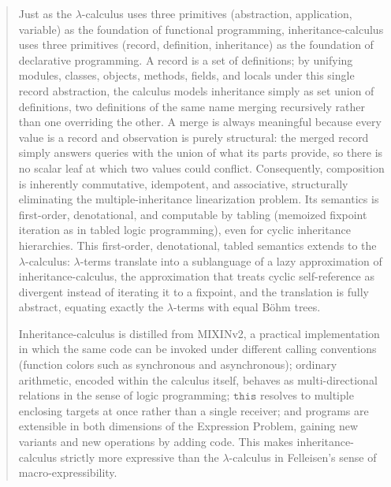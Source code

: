 \begin{abstract}
  Just as the $\lambda$-calculus uses three primitives (abstraction, application, variable) as the foundation of functional programming, inheritance-calculus uses three primitives (record, definition, inheritance) as the foundation of declarative programming. A record is a set of definitions; by unifying modules, classes, objects, methods, fields, and locals under this single record abstraction, the calculus models inheritance simply as set union of definitions, two definitions of the same name merging recursively rather than one overriding the other. A merge is always meaningful because every value is a record and observation is purely structural: the merged record simply answers queries with the union of what its parts provide, so there is no scalar leaf at which two values could conflict. Consequently, composition is inherently commutative, idempotent, and associative, structurally eliminating the multiple-inheritance linearization problem. Its semantics is first-order, denotational, and computable by tabling (memoized fixpoint iteration as in tabled logic programming), even for cyclic inheritance hierarchies. This first-order, denotational, tabled semantics extends to the $\lambda$-calculus: $\lambda$-terms translate into a sublanguage of a lazy approximation of inheritance-calculus, the approximation that treats cyclic self-reference as divergent instead of iterating it to a fixpoint, and the translation is fully abstract, equating exactly the $\lambda$-terms with equal B\"ohm trees.

  Inheritance-calculus is distilled from MIXINv2, a practical implementation in which the same code can be invoked under different calling conventions (function colors such as synchronous and asynchronous); ordinary arithmetic, encoded within the calculus itself, behaves as multi-directional relations in the sense of logic programming; $\mathtt{this}$ resolves to multiple enclosing targets at once rather than a single receiver; and programs are extensible in both dimensions of the Expression Problem, gaining new variants and new operations by adding code. This makes inheritance-calculus strictly more expressive than the $\lambda$-calculus in Felleisen's sense of macro-expressibility.
\end{abstract}

